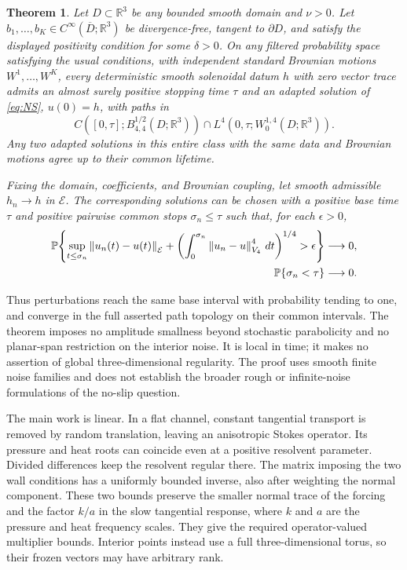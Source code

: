 \documentclass[11pt]{article}
\numberwithin{equation}{section}
\newtheorem{theorem}{Theorem}[section]
\theoremstyle{remark}
\newcommand{\R}{\mathbb R}
\newcommand{\PP}{\mathbb P}
\newcommand{\calE}{\mathcal E}
\newcommand{\norm}[1]{\left\lVert#1\right\rVert}
\begin{document}
\begin{theorem}\label{thm:main}
Let $D\subset\R^3$ be any bounded smooth domain and $\nu>0$.
Let $b_1,\ldots,b_K\in C^\infty(\overline D;\R^3)$ be
divergence-free, tangent to $\partial D$, and satisfy the displayed
positivity condition for some $\delta>0$. On any filtered probability
space satisfying the usual conditions, with independent standard
Brownian motions $W^1,\ldots,W^K$, every deterministic smooth
solenoidal datum $h$ with zero vector trace admits an almost surely
positive stopping time $\tau$ and an adapted solution of
\eqref{eq:NS}, $u(0)=h$, with paths in
\begin{equation}\label{eq:main-class}
 C([0,\tau];B^{1/2}_{4,4}(D;\R^3))
 \cap L^4(0,\tau;W^{1,4}_0(D;\R^3)).
\end{equation}
Any two adapted solutions in this entire class with the same data
and Brownian motions agree up to their common lifetime.

Fixing the domain, coefficients, and Brownian coupling, let smooth
admissible $h_n\to h$ in $\calE$. The corresponding solutions can be
chosen with a positive base time $\tau$ and positive pairwise common
stops $\sigma_n\leq\tau$ such that, for each $\epsilon>0$,
\begin{align}\label{eq:main-dependence}
 \PP\!\left\{\sup_{t\leq\sigma_n}\norm{u_n(t)-u(t)}_{\calE}
 +\left(\int_0^{\sigma_n}\norm{u_n-u}_{V_4}^4\,dt\right)^{1/4}
 >\epsilon\right\}&\longrightarrow0,\\
 \PP\{\sigma_n<\tau\}&\longrightarrow0.\notag
\end{align}
\end{theorem}

Thus perturbations reach the same base interval with probability
tending to one, and converge in the full asserted path topology on
their common intervals. The theorem imposes no amplitude smallness
beyond stochastic parabolicity and no planar-span restriction on
the interior noise. It is local in time; it makes no assertion of
global three-dimensional regularity. The proof uses smooth finite
noise families and does not establish the broader rough or
infinite-noise formulations of the no-slip question.

The main work is linear. In a flat channel, constant tangential
transport is removed by random translation, leaving an anisotropic
Stokes operator. Its pressure and heat roots can coincide even at
a positive resolvent parameter. Divided differences keep the
resolvent regular there. The matrix imposing the two wall conditions
has a uniformly bounded inverse, also after weighting the normal
component. These two bounds preserve the smaller normal trace of the
forcing and the factor $k/a$ in the slow tangential response, where
$k$ and $a$ are the pressure and heat frequency scales. They give the
required operator-valued multiplier bounds. Interior points instead use
a full three-dimensional torus,
so their frozen vectors may have arbitrary rank.
\end{document}
